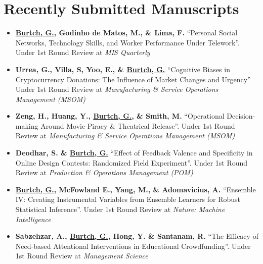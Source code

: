 \documentclass[10.5pt,letterpaper,sans]{moderncv}        %
\begin{document}
\section{Recently Submitted Manuscripts}

\begin{itemize}[leftmargin=!,labelindent=5pt,itemindent=-15pt]


\item \textbf{\underline{Burtch, G.}, Godinho de Matos, M., \& Lima, F.} ``Personal Social Networks, Technology Skills, and Worker Performance Under Telework''. Under 1st Round Review at \textit{MIS Quarterly}

\item \textbf{Urrea, G., Villa, S, Yoo, E., \& \underline{Burtch, G.}} ``Cognitive Biases in Cryptocurrency Donations: The Influence of Market Changes and Urgency'' Under 1st Round Review at \textit{Manufacturing \& Service Operations Management (MSOM)}

\item \textbf{Zeng, H., Huang, Y., \underline{Burtch, G.}, \& Smith, M.} ``Operational Decision-making Around Movie Piracy \& Theatrical Release''. Under 1st Round Review at \textit{Manufacturing \& Service Operations Management (MSOM)}

\item \textbf{Deodhar, S. \& \underline{Burtch, G.}} ``Effect of Feedback Valence and Specificity in Online Design Contests: Randomized Field Experiment''. Under 1st Round Review at \textit{Production \& Operations Management (POM)}

\item \textbf{\underline{Burtch, G.}, McFowland E., Yang, M., \& Adomavicius, A.} ``Ensemble IV: Creating Instrumental Variables from Ensemble Learners for Robust Statistical Inference''. Under 1st Round Review at \textit{Nature: Machine Intelligence}

\item \textbf{Sabzehzar, A., \underline{Burtch, G.}, Hong, Y. \& Santanam, R.} ``The Efficacy of Need-based Attentional Interventions in Educational Crowdfunding''. Under 1st Round Review at \textit{Management Science}


\end{itemize}
\end{document}
